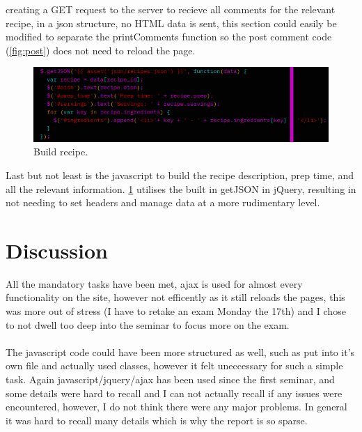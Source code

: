 \documentclass[a4paper]{scrartcl}
\begin{document}
creating a GET request to the server to recieve all comments for the relevant recipe,
in a json structure, no HTML data is sent,
this section could easily be modified to separate the printComments function so
the post comment code (\ref{fig:post}) does not need to reload the page.
\begin{figure}[H]
  \begin{center}
    \includegraphics[scale=1.0]{images/build_recipe.png}
    \caption{Build recipe.}
    \label{fig:build_rec}
  \end{center}
\end{figure}
\noindent
Last but not least is the javascript to build the recipe description, prep time, and all the relevant information.
\ref{fig:build_rec} utilises the built in getJSON in jQuery, resulting in not needing to
set headers and manage data at a more rudimentary level.
\section{Discussion}

All the mandatory tasks have been met, ajax is used for almost every functionality on the site,
however not efficently as it still reloads the pages, this was more out of stress (I have to retake an exam Monday the 17th)
and I chose to not dwell too deep into the seminar to focus more on the exam.
\\\\
The javascript code could have been more structured as well, such as put into it's
own file and actually used classes, however it felt uneccessary for such
a simple task. Again javascript/jquery/ajax has been used since the first seminar, and some details were hard to recall
and I can not actually recall if any issues were encountered, however, I do not think there were any major problems.
In general it was hard to recall many details which is why the report is so sparse.
\end{document}
